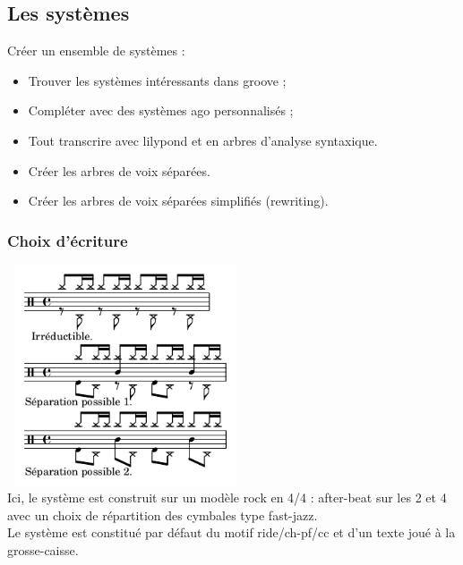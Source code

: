 \subsection{Les systèmes}
Créer un ensemble de systèmes :
\begin{itemize}
\item Trouver les systèmes intéressants dans groove ;
\item Compléter avec des systèmes ago personnalisés ;
\item Tout transcrire avec lilypond et en arbres d’analyse syntaxique.
\item Créer les arbres de voix séparées.
\item Créer les arbres de voix séparées simplifiés (rewriting).\\	
\end{itemize}

\subsubsection{Choix d’écriture}
\includegraphics[height=65mm, width=70mm]{z_images/notation/experimentations/separation_drummer_01_session1_004.png}\\
Ici, le système est construit sur un modèle rock en 4/4 : after-beat sur les 2 et 4 avec un choix de répartition des cymbales type fast-jazz.\\
Le système est constitué par défaut du motif ride/ch-pf/cc et d’un texte joué à la grosse-caisse.\\


